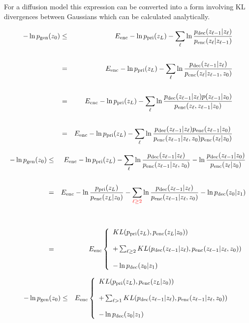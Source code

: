 {\vfill
For a diffusion model this expression can be converted into a form involving KL divergences between Gaussians which can be calculated analytically.


{\huge
\begin{eqnarray*}
- \ln p_{\mathrm{gen}}(z_0) & \leq & E_{\mathrm{enc}} -\ln p_{\mathrm{pri}}(z_L) - \sum_{\ell } \ln \frac{p_{\mathrm{dec}}(z_{\ell-1}|z_\ell)}{p_{\mathrm{enc}}(z_\ell|z_{\ell-1})} \\
\\
& = & E_{\mathrm{enc}} -\ln p_{\mathrm{pri}}(z_L) - \sum_{\ell } \ln \frac{p_{\mathrm{dec}}(z_{\ell-1}|z_\ell)}{p_{\mathrm{enc}}(z_\ell|z_{\ell-1},z_0)} \\
\\
& = & E_{\mathrm{enc}} -\ln p_{\mathrm{pri}}(z_L) - \sum_{\ell } \ln \frac{p_{\mathrm{dec}}(z_{\ell-1}|z_\ell)p(z_{\ell-1}|z_0)}{p_{\mathrm{enc}}(z_\ell,z_{\ell-1}|z_0)} \\
\\
& = & E_{\mathrm{enc}} -\ln p_{\mathrm{pri}}(z_L) - \sum_{\ell } \ln \frac{p_{\mathrm{dec}}(z_{\ell-1}|z_\ell)p_{\mathrm{enc}}(z_{\ell-1}|z_0)}{p_{\mathrm{enc}}(z_{\ell-1}|z_\ell,z_0)p_{\mathrm{enc}}(z_\ell|z_0)}
\end{eqnarray*}
}



{\huge
\begin{eqnarray*}
- \ln p_{\mathrm{gen}}(z_0) & \leq & E_{\mathrm{enc}} -\ln p_{\mathrm{pri}}(z_L) - \sum_{\ell } \ln \frac{p_{\mathrm{dec}}(z_{\ell-1}|z_\ell)}{p_{\mathrm{enc}}(z_{\ell-1}|z_\ell,z_0)}
- \ln \frac{p_{\mathrm{dec}}(z_{\ell-1}|z_0)}{p_{\mathrm{enc}}(z_\ell|z_0)} \\
\\
& = & E_{\mathrm{enc}} -\ln \frac{p_{\mathrm{pri}}(z_L)}{p_{\mathrm{enc}}(z_L|z_0)} - \sum_{\color{red} \ell \geq 2} \ln \frac{p_{\mathrm{dec}}(z_{\ell-1}|z_\ell)}{p_{\mathrm{enc}}(z_{\ell-1}|z_\ell,z_0)} - \ln p_{\mathrm{dec}}(z_0|z_1) \\
\\
\\
& = & E_{\mathrm{enc}} \left\{\begin{array}{l}KL(p_{\mathrm{pri}}(z_L),p_{\mathrm{enc}}(z_L|z_0)) \\
\\
+ \sum_{\ell \geq 2} KL(p_{\mathrm{dec}}(z_{\ell-1}|z_\ell),p_{\mathrm{enc}}(z_{\ell-1}|z_\ell,z_0)) \\
\\
- \ln p_{\mathrm{dec}}(z_0|z_1) \end{array} \right.
\end{eqnarray*}
}



{\huge
\begin{eqnarray*}
- \ln p_{\mathrm{gen}}(z_0) & \leq &
E_{\mathrm{enc}} \left\{\begin{array}{l}KL(p_{\mathrm{pri}}(z_L),p_{\mathrm{enc}}(z_L|z_0)) \\
\\
+ \sum_{\ell > 1} KL(p_{\mathrm{dec}}(z_{\ell-1}|z_\ell),p_{\mathrm{enc}}(z_{\ell-1}|z_\ell,z_0)) \\
\\
- \ln p_{\mathrm{dec}}(z_0|z_1) \end{array} \right.
\end{eqnarray*}
}

}
